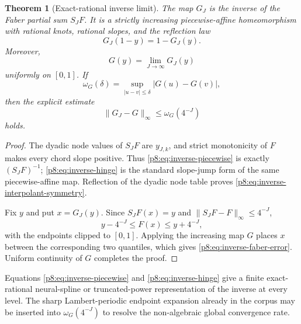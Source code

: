 \documentclass[11pt]{article}
\newtheorem{theorem}{Theorem}[section]
\theoremstyle{definition}
\theoremstyle{remark}
\begin{document}
\begin{theorem}[Exact-rational inverse limit]
\label{p8:thm:inverse-faber-limit}
The map $G_J$ is the inverse of the Faber partial sum $S_JF$.  It is a
strictly increasing piecewise-affine homeomorphism with rational knots,
rational slopes, and the reflection law
\begin{equation}
 G_J(1-y)=1-G_J(y).                                      \label{p8:eq:inverse-interpolant-symmetry}
\end{equation}
Moreover,
\begin{equation}
 \boxed{\displaystyle
 G(y)=\lim_{J\to\infty}G_J(y)}                       \label{p8:eq:inverse-faber-limit}
\end{equation}
uniformly on $[0,1]$.  If
\begin{equation}
 \omega_G(\delta)=
 \sup_{|u-v|\le\delta}|G(u)-G(v)|,                  \label{p8:eq:inverse-modulus}
\end{equation}
then the explicit estimate
\begin{equation}
 \boxed{\displaystyle
 \|G_J-G\|_\infty\le\omega_G(4^{-J})}             \label{p8:eq:inverse-faber-error}
\end{equation}
holds.
\end{theorem}

\begin{proof}
The dyadic node values of $S_JF$ are $y_{J,k}$, and strict monotonicity of
$F$ makes every chord slope positive.  Thus \eqref{p8:eq:inverse-piecewise} is
exactly $(S_JF)^{-1}$; \eqref{p8:eq:inverse-hinge} is the standard
slope-jump form of the same piecewise-affine map.  Reflection of the dyadic
node table proves \eqref{p8:eq:inverse-interpolant-symmetry}.

Fix $y$ and put $x=G_J(y)$.  Since $S_JF(x)=y$ and
$\|S_JF-F\|_\infty\le4^{-J}$,
\[
 y-4^{-J}\le F(x)\le y+4^{-J},
\]
with the endpoints clipped to $[0,1]$.  Applying the increasing map $G$
places $x$ between the corresponding two quantiles, which gives
\eqref{p8:eq:inverse-faber-error}.  Uniform continuity of $G$ completes the
proof.
\end{proof}

\newresult Equations \eqref{p8:eq:inverse-piecewise} and
\eqref{p8:eq:inverse-hinge} give a finite exact-rational neural-spline or
truncated-power representation of the inverse at every level.  The sharp
Lambert-periodic endpoint expansion already in the corpus may be inserted
into $\omega_G(4^{-J})$ to resolve the non-algebraic global convergence rate.
\end{document}

